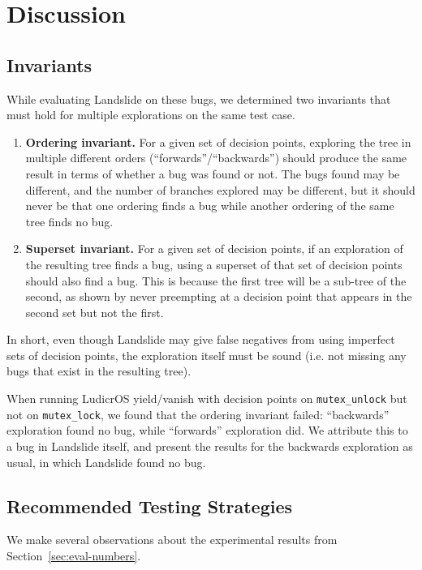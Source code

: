 \section{Discussion}

\subsection{Invariants}

While evaluating Landslide on these bugs, we determined two invariants that must hold for multiple explorations on the same test case.

\begin{enumerate}
	\item {\bf Ordering invariant.} For a given set of decision points, exploring the tree in multiple different orders (``forwards''/``backwards'') should produce the same result in terms of whether a bug was found or not. The bugs found may be different, and the number of branches explored may be different, but it should never be that one ordering finds a bug while another ordering of the same tree finds no bug.
	\item {\bf Superset invariant.} For a given set of decision points, if an exploration of the resulting tree finds a bug, using a superset of that set of decision points should also find a bug. This is because the first tree will be a sub-tree of the second, as shown by never preempting at a decision point that appears in the second set but not the first.
\end{enumerate}

In short, even though Landslide may give false negatives from using imperfect sets of decision points, the exploration itself must be sound (i.e. not missing any bugs that exist in the resulting tree).

When running LudicrOS yield/vanish with decision points on \texttt{mutex\_unlock} but not on \texttt{mutex\_lock}, we found that the ordering invariant failed: ``backwards'' exploration found no bug, while ``forwards'' exploration did. We attribute this to a bug in Landslide itself, and present the results for the backwards exploration as usual, in which Landslide found no bug.

\subsection{Recommended Testing Strategies}
\label{sec:discussion-strategies}

We make several observations about the experimental results from Section~\ref{sec:eval-numbers}.

